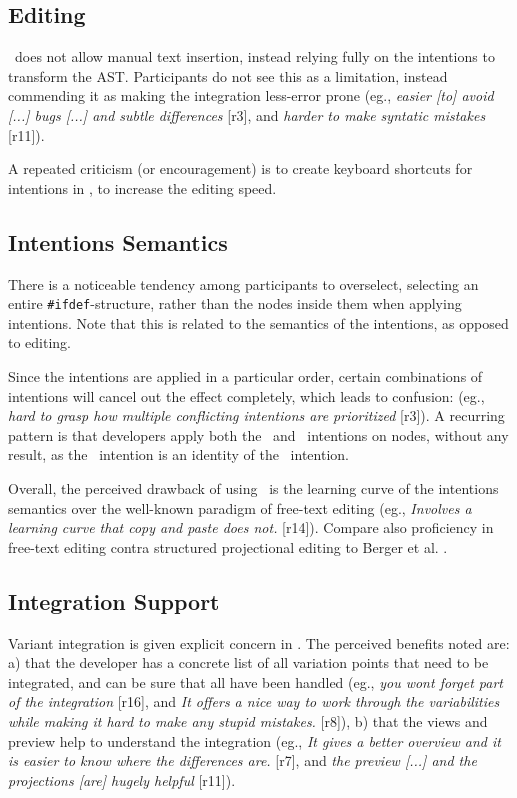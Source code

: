 \subsection{Editing}
\tooln~does not allow manual text insertion, instead relying fully on the intentions to transform the AST. Participants do not see this as a limitation, instead commending it as making the integration less-error prone (eg., \textit{\bc easier [to] avoid [...] bugs [...] and subtle differences\ec} [r3], and \textit{\bc harder to make syntatic mistakes\ec} [r11]).

A repeated criticism (or encouragement) is to create keyboard shortcuts for intentions in \tooln, to increase the editing speed.


\subsection{Intentions Semantics}
There is a noticeable tendency among participants to overselect, selecting an entire \texttt{\#ifdef}-structure, rather than the nodes inside them when applying intentions. Note that this is related to the semantics of the intentions, as opposed to editing.

Since the intentions are applied in a particular order, certain combinations of intentions will cancel out the effect completely, which leads to confusion: (eg., \textit{\bc hard to grasp how multiple conflicting intentions are prioritized\ec} [r3]). A recurring pattern is that developers apply both the \keep~and \keepasf~intentions on nodes, without any result, as the \keep~intention is an identity of the \keepasf~intention.

Overall, the perceived drawback of using \tooln~is the learning curve of the intentions semantics over the well-known paradigm of free-text editing (eg., \textit{\bc Involves a learning curve that copy and paste does not.\ec} [r14]). Compare also proficiency in free-text editing contra structured projectional editing to Berger et al. \cite{berger2016mps}.


\subsection{Integration Support}
Variant integration is given explicit concern in \tooln. The perceived benefits noted are: a) that the developer has a concrete list of all variation points that need to be integrated, and can be sure that all have been handled (eg., \textit{\bc you wont forget part of the integration\ec} [r16], and \textit{\bc It offers a nice way to work through the variabilities while making it hard to make any stupid mistakes.\ec} [r8]), b) that the views and preview help to understand the integration (eg., \textit{\bc It gives a better overview and it is easier to know where the differences are.\ec} [r7], and \textit{\bc the preview [...] and the projections [are] hugely helpful\ec} [r11]).


